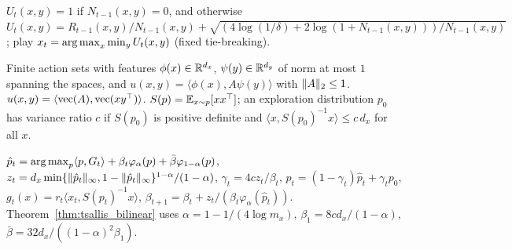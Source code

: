 \begin{definition}
  \label{def:maximin_ucb}
  \leanok
  $U_t(x, y) = 1$ if $N_{t-1}(x, y) = 0$, and otherwise
  $U_t(x, y) = R_{t-1}(x, y)/N_{t-1}(x, y) + \sqrt{(4 \log(1/\delta) + 2 \log(1 + N_{t-1}(x, y)))
  / N_{t-1}(x, y)}$; play $x_t = \operatorname*{arg\,max}_x \min_y U_t(x, y)$ (fixed tie-breaking).
\end{definition}

\begin{definition}
  \label{def:bilinear}
  \leanok
  Finite action sets with features $\phi(x) \in \mathbb{R}^{d_x}$, $\psi(y) \in \mathbb{R}^{d_y}$ of norm at most
  $1$ spanning the spaces, and $u(x, y) = \langle \phi(x), A \psi(y)\rangle$ with $\lVert A \rVert_2 \le 1$.
  $u(x, y) = \langle \operatorname{vec}(A), \operatorname{vec}(x y^\top)\rangle$. $S(p) = \mathbb{E}_{x \sim p}[x x^\top]$; an
  exploration distribution $p_0$ has variance ratio $c$ if $S(p_0)$ is positive definite and
  $\langle x, S(p_0)^{-1} x\rangle \le c\, d_x$ for all $x$.
\end{definition}

\begin{definition}
  \label{def:tsallis_spm}
  \leanok
  $\hat p_t = \operatorname*{arg\,max}_p \langle p, G_t\rangle + \beta_t \varphi_\alpha(p) + \bar\beta
  \varphi_{1-\alpha}(p)$, $z_t = d_x \min\{\lVert \hat p_t \rVert_\infty, 1 - \lVert \hat p_t \rVert_\infty\}^{1 -
  \alpha}/(1 - \alpha)$, $\gamma_t = 4 c z_t/\beta_t$, $p_t = (1 - \gamma_t)\hat p_t + \gamma_t
  p_0$, $g_t(x) = r_t \langle x_t, S(p_t)^{-1} x\rangle$,
  $\beta_{t+1} = \beta_t + z_t/(\beta_t \varphi_\alpha(\hat p_t))$. Theorem~\ref{thm:tsallis_bilinear}
  uses $\alpha = 1 - 1/(4 \log m_x)$, $\beta_1 = 8 c d_x/(1 - \alpha)$,
  $\bar\beta = 32 d_x/((1 - \alpha)^2 \beta_1)$.
\end{definition}

